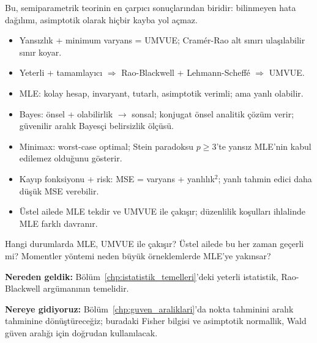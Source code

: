 \noindent Bu, semiparametrik teorinin en çarpıcı sonuçlarından biridir: bilinmeyen hata dağılımı, asimptotik olarak hiçbir kayba yol açmaz.


\begin{mikroozet}
\begin{itemize}
  \item Yansızlık + minimum varyans = UMVUE; Cramér-Rao alt sınırı ulaşılabilir sınır koyar.
  \item Yeterli + tamamlayıcı $\Rightarrow$ Rao-Blackwell + Lehmann-Scheffé $\Rightarrow$ UMVUE.
  \item MLE: kolay hesap, invaryant, tutarlı, asimptotik verimli; ama yanlı olabilir.
  \item Bayes: önsel + olabilirlik $\to$ sonsal; konjugat önsel analitik çözüm verir; güvenilir aralık Bayesçi belirsizlik ölçüsü.
  \item Minimax: worst-case optimal; Stein paradoksu $p\geq3$'te yansız MLE'nin kabul edilemez olduğunu gösterir.
  \item Kayıp fonksiyonu + risk: MSE = varyans + yanlılık$^2$; yanlı tahmin edici daha düşük MSE verebilir.
  \item Üstel ailede MLE tekdir ve UMVUE ile çakışır; düzenlilik koşulları ihlalinde MLE farklı davranır.
\end{itemize}
\end{mikroozet}

\begin{ozyansima}
Hangi durumlarda MLE, UMVUE ile çakışır? Üstel ailede bu her zaman geçerli mi? Momentler yöntemi neden büyük örneklemlerde MLE'ye yakınsar?
\end{ozyansima}

\begin{kopru}
\textbf{Nereden geldik:} Bölüm~\ref{chp:istatistik_temelleri}'deki yeterli istatistik, Rao-Blackwell argümanının temelidir.

\textbf{Nereye gidiyoruz:} Bölüm~\ref{chp:guven_araliklari}'da nokta tahminini aralık tahminine dönüştüreceğiz; buradaki Fisher bilgisi ve asimptotik normallik, Wald güven aralığı için doğrudan kullanılacak.
\end{kopru}


\cozumlualistirmalar

